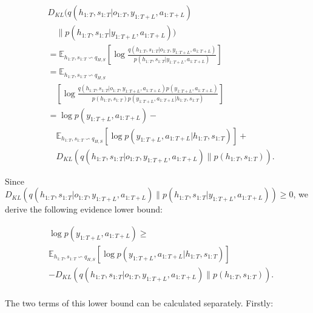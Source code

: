 \begin{footnotesize} 
	\begin{equation} \label{1}
	\begin{aligned}
	&D_{KL}(q(h_{1:T},s_{1:T}|o_{1:T},y_{1:T+L},a_{1:T+L})  \\
	&\quad \parallel p(h_{1:T},s_{1:T}|y_{1:T+L},a_{1:T+L}))\\
	&=\mathbb{E}_{h_{1:T},s_{1:T}\backsim q_{H,S}}[{\log}\tfrac{q(h_{1:T},s_{1:T}|o_{1:T},y_{1:T+L},a_{1:T+L})}{p(h_{1:T},s_{1:T}|y_{1:T+L},a_{1:T+L})}]\\
	&=\mathbb{E}_{h_{1:T},s_{1:T}\backsim q_{H,S}}\\
	&\quad[{\log}\tfrac{q(h_{1:T},s_{1:T}|o_{1:T},y_{1:T+L},a_{1:T+L})p(y_{1:T+L},a_{1:T+L})}{p(h_{1:T},s_{1:T})p(y_{1:T+L},a_{1:T+L}|h_{1:T},s_{1:T})}]\\  
	&=\log p(y_{1:T+L},a_{1:T+L})- \\
	&\quad \mathbb{E}_{h_{1:T},s_{1:T}\backsim q_{H,S}}[\log p(y_{1:T+L},a_{1:T+L}|h_{1:T},s_{1:T})]+ \\ 
	&\quad D_{KL}(q(h_{1:T},s_{1:T}|o_{1:T},y_{1:T+L},a_{1:T+L})\parallel p(h_{1:T},s_{1:T})).
	\end{aligned}
	\end{equation} 
\end{footnotesize}

Since $D_{KL}(q(h_{1:T},s_{1:T}|o_{1:T},y_{1:T+L},a_{1:T+L})\parallel p(h_{1:T},s_{1:T}|y_{1:T+L},a_{1:T+L}))\geq 0$, we derive the following evidence lower bound:

\begin{footnotesize} 
	\begin{equation} \label{3}
	\begin{aligned}
	&\log p(y_{1:T+L},a_{1:T+L}) \geq\\ &\mathbb{E}_{h_{1:T},s_{1:T}\backsim q_{H,S}}[\log p(y_{1:T+L},a_{1:T+L}|h_{1:T},s_{1:T})] \\
	&- D_{KL}(q(h_{1:T},s_{1:T}|o_{1:T},y_{1:T+L},a_{1:T+L})\parallel p(h_{1:T},s_{1:T})).\\  
	\end{aligned}
	\end{equation} 
\end{footnotesize}

The two terms of this lower bound can be calculated separately. Firstly:

